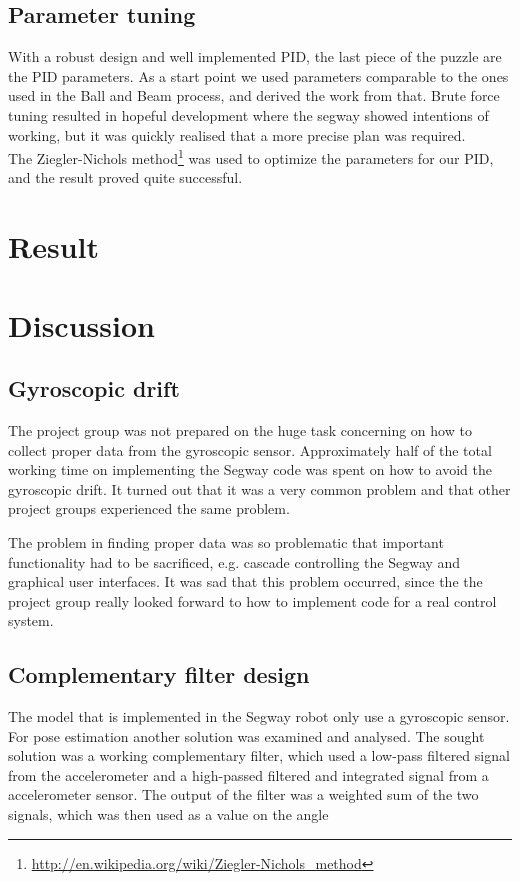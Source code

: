 \subsection{Parameter tuning}
With a robust design and well implemented PID, the last piece of the puzzle are the PID parameters. As a start point we used parameters comparable to the ones used in the Ball and Beam process, and derived the work from that. Brute force tuning resulted in hopeful development where the segway showed intentions of working, but it was quickly realised that a more precise plan was required.
\\[3ex]
The Ziegler-Nichols method\footnote{\url{http://en.wikipedia.org/wiki/Ziegler-Nichols_method}} was used to optimize the parameters for our PID, and the result proved quite successful. 

\section{Result}

\section{Discussion}

\subsection{Gyroscopic drift}
The project group was not prepared on the huge task concerning on how to collect proper data from the gyroscopic sensor. Approximately half of the total working time on implementing the Segway code was spent on how to avoid the gyroscopic drift. 
It turned out that it was a very common problem and that other project groups experienced the same problem. 

\noindent The problem in finding proper data was so problematic that important functionality had to be sacrificed, e.g. cascade controlling the Segway and graphical user interfaces. It was sad that this problem occurred, since the the project group really looked forward to how to implement code for a real control system. 

\subsection{Complementary filter design}
The model that is implemented in the Segway robot only use a gyroscopic sensor. For pose estimation another solution was examined and analysed. The sought solution was a working complementary filter, which used a low-pass filtered signal from the accelerometer and a high-passed filtered and integrated signal from a accelerometer sensor. The output of the filter was a weighted sum of the two signals, which was then used as a value on the angle 
 
